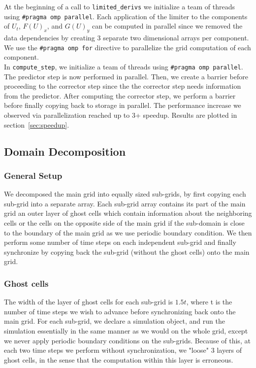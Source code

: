 \documentclass[11pt]{article}
\begin{document}
At the beginning of a call to \texttt{limited\_derivs} we initialize a team of threads using \texttt{\#pragma omp parallel}. Each application of the limiter to the components of $U_t$, $F(U)_x$, and $G(U)_y$ can be computed in parallel since we removed the data dependencies by creating 3 separate two dimensional arrays per component. We use the \texttt{\#pragma omp for} directive to parallelize the grid computation of each component. \\

In \texttt{compute\_step}, we initialize a team of threads using \texttt{\#pragma omp parallel}. The predictor step is now performed in parallel. Then, we create a barrier before proceeding to the corrector step since the the corrector step needs information from the predictor. After computing the corrector step, we perform a barrier before finally copying back to storage in parallel. The performance increase we observed via parallelization reached up to 3+ speedup. Results are plotted in section~\ref{sec:speedup}.


\subsection{Domain Decomposition}


\subsubsection{General Setup}
We decomposed the main grid into equally sized sub-grids, by first copying  each sub-grid into a separate array. Each sub-grid array contains its part of the main grid an outer layer of ghost cells which contain information about the neighboring cells or the cells on the opposite side of the main grid if the sub-domain is close to the boundary of the main grid as we use periodic boundary condition. We then perform some number of time steps on each independent sub-grid and finally synchronize by copying back the sub-grid (without the ghost cells) onto the main grid. 

\subsubsection{Ghost cells}

The width of the layer of ghost cells for each sub-grid is $1.5t$, where t is the number of time steps we wish to advance before synchronizing back onto the main grid. For each sub-grid, we declare a simulation object, and run the simulation essentially in the same manner as we would on the whole grid, except we never apply periodic boundary conditions on the sub-grids. Because of this, at each two time steps we perform without synchronization, we "loose" 3 layers of ghost cells, in the sense that the computation within this layer is erroneous. \\
\end{document}
